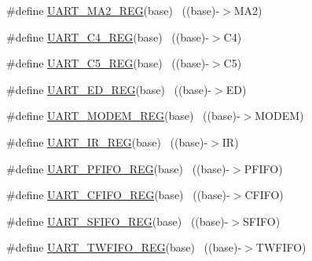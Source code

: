 \begin{DoxyCompactItemize}
\item 
\#define \hyperlink{group___u_a_r_t___register___accessor___macros_gac6084c1fb51427542a68f94fdfde5249}{U\+A\+R\+T\+\_\+\+M\+A2\+\_\+\+R\+EG}(base)                                          ~((base)-\/$>$M\+A2)
\item 
\#define \hyperlink{group___u_a_r_t___register___accessor___macros_ga53f71f873e006d84f394f97bb65e5174}{U\+A\+R\+T\+\_\+\+C4\+\_\+\+R\+EG}(base)                                            ~((base)-\/$>$C4)
\item 
\#define \hyperlink{group___u_a_r_t___register___accessor___macros_gac990a0ea0a078cb39530836bf18de75c}{U\+A\+R\+T\+\_\+\+C5\+\_\+\+R\+EG}(base)                                            ~((base)-\/$>$C5)
\item 
\#define \hyperlink{group___u_a_r_t___register___accessor___macros_ga57f93e1822a33516f473d1b62075115a}{U\+A\+R\+T\+\_\+\+E\+D\+\_\+\+R\+EG}(base)                                            ~((base)-\/$>$ED)
\item 
\#define \hyperlink{group___u_a_r_t___register___accessor___macros_ga7508e2348a7d075db40ace1902a407fa}{U\+A\+R\+T\+\_\+\+M\+O\+D\+E\+M\+\_\+\+R\+EG}(base)                                      ~((base)-\/$>$M\+O\+D\+EM)
\item 
\#define \hyperlink{group___u_a_r_t___register___accessor___macros_gae4a662d77f88c67afe8fe2c1d5e2fa81}{U\+A\+R\+T\+\_\+\+I\+R\+\_\+\+R\+EG}(base)                                            ~((base)-\/$>$IR)
\item 
\#define \hyperlink{group___u_a_r_t___register___accessor___macros_ga7cb53756bda6ba3cb137ecf5ac5f13ae}{U\+A\+R\+T\+\_\+\+P\+F\+I\+F\+O\+\_\+\+R\+EG}(base)                                      ~((base)-\/$>$P\+F\+I\+FO)
\item 
\#define \hyperlink{group___u_a_r_t___register___accessor___macros_gaabc1c7c6bba8bb960193478fa697fe15}{U\+A\+R\+T\+\_\+\+C\+F\+I\+F\+O\+\_\+\+R\+EG}(base)                                      ~((base)-\/$>$C\+F\+I\+FO)
\item 
\#define \hyperlink{group___u_a_r_t___register___accessor___macros_ga6cb39496b0199428a152fa8a68ec6a56}{U\+A\+R\+T\+\_\+\+S\+F\+I\+F\+O\+\_\+\+R\+EG}(base)                                      ~((base)-\/$>$S\+F\+I\+FO)
\item 
\#define \hyperlink{group___u_a_r_t___register___accessor___macros_ga6204d5850da243402d242d414cdb66f0}{U\+A\+R\+T\+\_\+\+T\+W\+F\+I\+F\+O\+\_\+\+R\+EG}(base)                                    ~((base)-\/$>$T\+W\+F\+I\+FO)

\end{DoxyCompactItemize}
